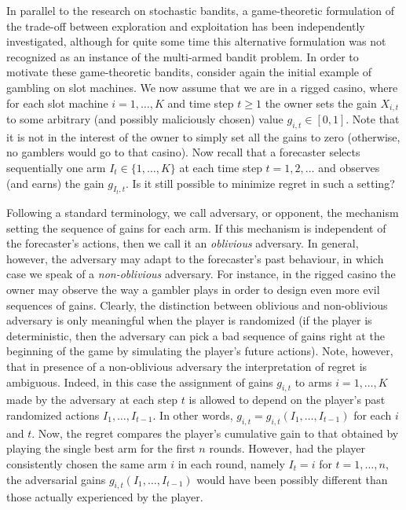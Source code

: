 \documentclass[11pt]{hackednow}
\begin{document}
In parallel to the research on stochastic bandits, a game-theoretic formulation of the trade-off between exploration and exploitation has been independently investigated, although for quite some time this alternative formulation was not recognized as an instance of the multi-armed bandit problem. In order to motivate these game-theoretic bandits, consider again the initial example of gambling on slot machines. We now assume that we are in a rigged casino, where for each slot machine $i=1,\hdots,K$ and time step $t \ge 1$ the owner sets the gain $X_{i,t}$ to some arbitrary (and possibly maliciously chosen) value $g_{i,t} \in [0,1]$. Note that it is not in the interest of the owner to simply set all the gains to zero (otherwise, no gamblers would go to that casino). Now recall that a forecaster selects sequentially one arm $I_t \in \{1,\hdots,K\}$ at each time step $t=1,2,\dots$ and observes (and earns) the gain $g_{I_t,t}$. Is it still possible to minimize regret in such a setting?

Following a standard terminology, we call adversary, or opponent, the mechanism setting the sequence of gains for each arm. If this mechanism is independent of the forecaster's actions, then we call it an \textsl{oblivious} adversary. In general, however, the adversary may adapt to the forecaster's past behaviour, in which case we speak of a \textsl{non-oblivious} adversary. For instance, in the rigged casino the owner may observe the way a gambler plays in order to design even more evil sequences of gains.
%
Clearly, the distinction between oblivious and non-oblivious adversary is only meaningful when the player is randomized (if the player is deterministic, then the adversary can pick a bad sequence of gains right at the beginning of the game by simulating the player's future actions). Note, however, that in presence of a non-oblivious adversary the interpretation of regret is ambiguous. Indeed, in this case the assignment of gains $g_{i,t}$ to arms $i=1,\dots,K$ made by the adversary at each step $t$ is allowed to depend on the player's past randomized actions $I_1,\dots,I_{t-1}$. In other words, $g_{i,t} = g_{i,t}(I_1,\dots,I_{t-1})$ for each $i$ and $t$. Now, the regret compares the player's cumulative gain to that obtained by playing the single best arm for the first $n$ rounds. However, had the player consistently chosen the same arm $i$ in each round, namely $I_t = i$ for $t=1,\dots,n$, the adversarial gains $g_{i,t}(I_1,\dots,I_{t-1})$ would have been possibly different than those actually experienced by the player.
\end{document}
